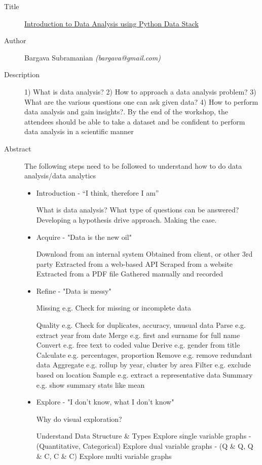 \begin{description}
   \item[Title] \underline{Introduction to Data Analysis using Python Data Stack}
   \item[Author] Bargava Subramanian \emph{(bargava@gmail.com)}
   \item[Description] 1) What is data analysis? 2) How to approach a data analysis problem? 3) What are the various questions one can ask given data? 4) How to perform data analysis and gain insights?. By the end of the workshop, the attendees should be able to take a dataset and be confident to perform data analysis in a scientific manner  
   \item[Abstract] The following steps need to be followed to understand how to do data analysis/data analytics
   \begin{itemize}
      \item Introduction - “I think, therefore I am”

What is data analysis? What type of questions can be answered? Developing a hypothesis drive approach. Making the case.

\item Acquire - "Data is the new oil"

Download from an internal system Obtained from client, or other 3rd party Extracted from a web-based API Scraped from a website Extracted from a PDF file Gathered manually and recorded

\item Refine - "Data is messy"

Missing e.g. Check for missing or incomplete data

Quality e.g. Check for duplicates, accuracy, unusual data Parse e.g. extract year from date Merge e.g. first and surname for full name Convert e.g. free text to coded value Derive e.g. gender from title Calculate e.g. percentages, proportion Remove e.g. remove redundant data Aggregate e.g. rollup by year, cluster by area Filter e.g. exclude based on location Sample e.g. extract a representative data Summary e.g. show summary stats like mean

\item Explore - "I don't know, what I don't know"

Why do visual exploration?

Understand Data Structure \& Types Explore single variable graphs - (Quantitative, Categorical) Explore dual variable graphs - (Q \& Q, Q \& C, C \& C) Explore multi variable graphs


\end{itemize}
\end{description}
